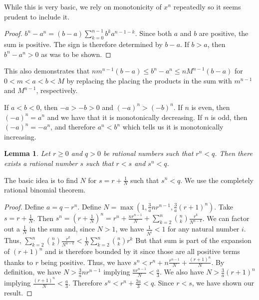 \documentclass[12pt]{article}
\newtheorem{lemma}{Lemma}[subsection]
\theoremstyle{remark}
\begin{document}
While this is very basic, we rely on monotonicity of $x^n$ repeatedly so it seems prudent to include it. 

\begin{proof}
$b^n-a^n= (b-a)\sum_{k=0}^{n-1} b^k a^{n-1-k}$. Since both $a$ and $b$ are positive, the sum is positive. The sign is therefore determined by $b-a$. If $b>a$, then $b^n-a^n > 0$ as was to be shown. 
\end{proof}

This also demonstrates that $ n m^{n-1} (b-a) \leq  b^n -a^n \leq n M^{n-1} (b-a)$ for $0 < m < a< b< M$ by replacing the placing the products in the sum with $m^{n-1}$ and $M^{n-1}$, respectively. 

If $ a< b< 0$, then $-a > -b > 0$ and $(-a)^n > (-b)^n$. If $n$ is even, then $(-a)^n = a^n$ and we have that it is monotonically decreasing. If $n$ is odd, then $(-a)^n = -a^n$, and therefore $a^n < b^n$ which tells us it is monotonically increasing. 

\begin{lemma}\label{app:lesser}
Let $r \geq 0 $ and $q > 0$ be rational numbers such that $r^n < q$. Then there exists a rational number $s$ such that $r < s$ and $s^n < q$.
\end{lemma}

The basic idea is to find $N$ for $s = r + \tfrac{1}{N}$ such that $s^n < q$. We use the completely rational binomial theorem.  

\begin{proof}
Define $a = q - r^n$. Define $N =  \max(1,\tfrac{3}{a}n r^{n-1}, \tfrac{3}{a}(r+1)^n)$.  Take $s = r + \tfrac{1}{N}$. Then $s^n = (r+ \tfrac{1}{N})^n = r^n + \tfrac{n r^{n-1}}{N} + \sum_{k=2}^{n} \binom{n}{k} \tfrac{r^k}{N^{n-k}}$. We can factor out a $\tfrac{1}{N}$ in the sum and, since $N > 1$, we have $\tfrac{1}{N^i} < 1$ for any natural number $i$. Thus, $\sum_{k=2}^{n} \binom{n}{k} \tfrac{r^k}{N^{n-k}} < \tfrac{1}{N} \sum_{k=2}^{n} \binom{n}{k} r^k$  But that sum is part of the expansion of $(r+1)^n$ and is therefore bounded by it since those are all positive terms thanks to $r$ being positive. Thus, we have $s^n < r^n + n \tfrac{r^{n-1}}{N} + \tfrac{ (r+1)^n }{N}$.  By definition, we have $N > \tfrac{3}{a} n r^{n-1}$ implying $\tfrac{ n r^{n-1}}{N} < \tfrac{a}{3}$. We also have $N > \tfrac{3}{a} (r+1)^n$ implying $ \tfrac{(r+1)^n}{N} < \tfrac{a}{3}$. Therefore $s^n < r^n + \tfrac{2 a}{3} < q$. Since $r<s$, we have shown our result. 
\end{proof}
\end{document}
